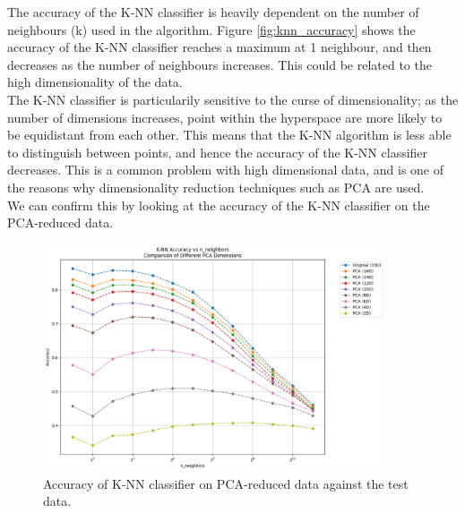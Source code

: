 \documentclass[12pt]{article}
\begin{document}
The accuracy of the K-NN classifier is heavily dependent on the number of neighbours (k) used in the algorithm. Figure \ref{fig:knn_accuracy} shows the accuracy of the K-NN classifier reaches a maximum at 1 neighbour, and then decreases as the number of neighbours increases. This could be related to the high dimensionality of the data.
\\
The K-NN classifier is particularily sensitive to the curse of dimensionality; as the number of dimensions increases, point within the hyperspace are more likely to be equidistant from each other. This means that the K-NN algorithm is less able to distinguish between points, and hence the accuracy of the K-NN classifier decreases. This is a common problem with high dimensional data, and is one of the reasons why dimensionality reduction techniques such as PCA are used.
\\

We can confirm this by looking at the accuracy of the K-NN classifier on the PCA-reduced data. 

\begin{figure}[H]
\centering
\includegraphics[width=0.9\textwidth]{figures/knn_accuracy_pca.png}
\caption{Accuracy of K-NN classifier on PCA-reduced data against the test data.}
\label{fig:knn_accuracy_pca}
\end{figure}
\end{document}
